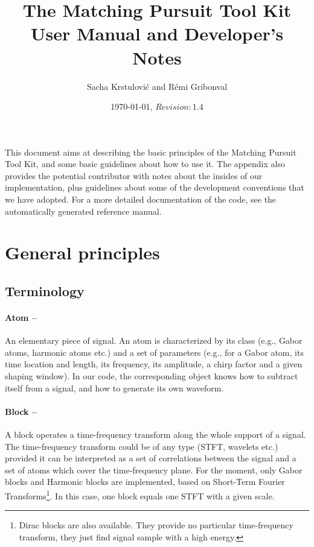 \documentclass[11pt,a4paper]{article}
\title{The Matching Pursuit Tool Kit \\ User Manual and Developer's Notes}
\author{Sacha Krstulovi\'c and R\'emi Gribonval}
\date{\today, $Revision: 1.4 $}
\begin{document}
\maketitle

\vfill

\tableofcontents

\vfill

\clearpage

\noindent This document aims at describing the basic principles of the Matching
Pursuit Tool Kit, and some basic guidelines about how to use it.  The appendix
also provides the potential contributor with notes about the insides of our
implementation, plus guidelines about some of the development conventions that
we have adopted. For a more detailed documentation of the code, see the
automatically generated reference manual.

\section{General principles \label{gen}}

\subsection{Terminology \label{term}}
\paragraph{Atom --} An elementary piece of signal. An atom is characterized by
its class (e.g., Gabor atoms, harmonic atoms etc.) and a set of parameters
(e.g., for a Gabor atom, its time location and length, its frequency, its
amplitude, a chirp factor and a given shaping window). In our code, the
corresponding object knows how to subtract itself from a signal, and how to
generate its own waveform.

\paragraph{Block --} A block operates a time-frequency transform
along the whole support of a signal. The time-frequency transform could be of
any type (STFT, wavelets etc.) provided it can be interpreted as a set of
correlations between the signal and a set of atoms which cover the
time-frequency plane. For the moment, only Gabor blocks and Harmonic blocks are
implemented, based on Short-Term Fourier Transforms\footnote{Dirac blocks are
  also available. They provide no particular time-frequency transform, they
  just find signal sample with a high energy.}. In this case, one block equals
one STFT with a given scale.
\end{document}
